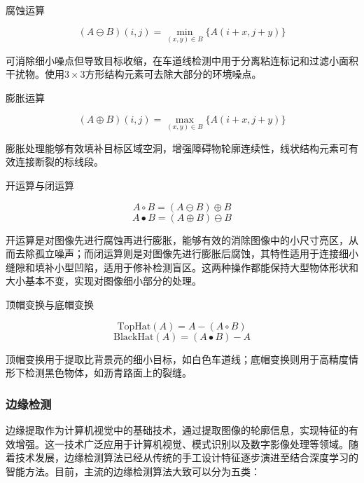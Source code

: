 \documentclass[a4paper, UTF8, fontsize=12pt]{ctexart} %
\numberwithin{equation}{section} %
\begin{document}
\begin{parlist}
\item 腐蚀运算

\begin{equation}
(A \ominus B)(i,j) = \min_{(x,y) \in B}\{ A(i + x,j + y)\}
\end{equation}

可消除细小噪点但导致目标收缩，在车道线检测中用于分离粘连标记和过滤小面积干扰物。使用$3 \times 3$方形结构元素可去除大部分的环境噪点。

\item 膨胀运算

\begin{equation}
(A \oplus B)(i,j) = \max_{(x,y) \in B}\{ A(i + x,j + y)\}
\end{equation}

膨胀处理能够有效填补目标区域空洞，增强障碍物轮廓连续性，线状结构元素可有效连接断裂的标线段。

\item 开运算与闭运算

\begin{equation}
A \circ B = (A \ominus B) \oplus B
\end{equation}
\begin{equation}
A \bullet B = (A \oplus B) \ominus B
\end{equation}

开运算是对图像先进行腐蚀再进行膨胀，能够有效的消除图像中的小尺寸亮区，从而去除孤立噪声；而闭运算则是对图像先进行膨胀后腐蚀，其特性适用于连接细小缝隙和填补小型凹陷，适用于修补检测盲区。这两种操作都能保持大型物体形状和大小基本不变，实现对图像细小部分的处理。

\item 顶帽变换与底帽变换

\begin{equation}
\text{TopHat}(A) = A - (A \circ B)
\end{equation}
\begin{equation}
\text{BlackHat}(A) = (A \bullet B) - A
\end{equation}

顶帽变换用于提取比背景亮的细小目标，如白色车道线；底帽变换则用于高精度情形下检测黑色物体，如沥青路面上的裂缝。
\end{parlist}


\subsubsection{边缘检测}

边缘提取作为计算机视觉中的基础技术，通过提取图像的轮廓信息，实现特征的有效增强。这一技术广泛应用于计算机视觉、模式识别以及数字影像处理等领域。随着技术发展，边缘检测算法已经从传统的手工设计特征逐步演进至结合深度学习的智能方法。目前，主流的边缘检测算法大致可以分为五类：
\end{document}
